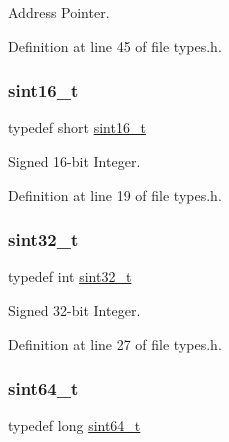 Address Pointer. 



Definition at line 45 of file types.\+h.

\mbox{\label{a00047_a5881659ed80e940350d12831204375cd_a5881659ed80e940350d12831204375cd}} 
\subsubsection{\texorpdfstring{sint16\+\_\+t}{sint16\_t}}
{\footnotesize\ttfamily typedef short \hyperlink{a00047_a5881659ed80e940350d12831204375cd_a5881659ed80e940350d12831204375cd}{sint16\+\_\+t}}



Signed 16-\/bit Integer. 



Definition at line 19 of file types.\+h.

\mbox{\label{a00047_ad838970452fe561cb8e0550cac5336be_ad838970452fe561cb8e0550cac5336be}} 
\subsubsection{\texorpdfstring{sint32\+\_\+t}{sint32\_t}}
{\footnotesize\ttfamily typedef int \hyperlink{a00047_ad838970452fe561cb8e0550cac5336be_ad838970452fe561cb8e0550cac5336be}{sint32\+\_\+t}}



Signed 32-\/bit Integer. 



Definition at line 27 of file types.\+h.

\mbox{\label{a00047_a04761b9e7480e1e48b0d392da17fd5d4_a04761b9e7480e1e48b0d392da17fd5d4}} 
\subsubsection{\texorpdfstring{sint64\+\_\+t}{sint64\_t}}
{\footnotesize\ttfamily typedef long \hyperlink{a00047_a04761b9e7480e1e48b0d392da17fd5d4_a04761b9e7480e1e48b0d392da17fd5d4}{sint64\+\_\+t}}



